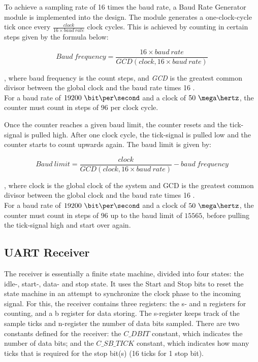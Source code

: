 \documentclass[main.tex]{subfiles}
\begin{document}
To achieve a sampling rate of 16 times the baud rate, a Baud Rate Generator module is implemented into the design. The module generates a one-clock-cycle tick once every $\frac{clock}{16 \times baud\ rate}$ clock cycles. This is achieved by counting in certain steps given by the formula below:

\begin{equation}
Baud\ frequency = \frac{16 \times baud\ rate}{GCD(clock, 16 \times baud\ rate)}
\end{equation}

, where baud frequency is the count steps, and \textit{GCD} is the greatest common divisor between the global clock and the baud rate times 16 \cite{velure10}. \\
For a baud rate of $19200\ \bit\per\second$ and a clock of $50\ \mega\hertz$, the counter must count in steps of $96$ per clock cycle. 

Once the counter reaches a given baud limit, the counter resets and the tick-signal is pulled high. After one clock cycle, the tick-signal is pulled low and the counter starts to count upwards again. The baud limit is given by:

\begin{equation}
Baud\ limit= \frac{clock}{GCD(clock, 16 \times baud\ rate)} - baud\ frequency
\end{equation}

, where clock is the global clock of the system and GCD is the greatest common divisor between the global clock and the baud rate times 16 \cite{velure10}. \\
For a baud rate of $19200\ \bit\per\second$ and a clock of $50\ \mega\hertz$, the counter must count in steps of $96$ up to the baud limit of $15565$, before pulling the tick-signal high and start over again. 

\subsection{UART Receiver}
The receiver is essentially a finite state machine, divided into four states: the idle-, start-, data- and stop state. It uses the Start and Stop bits to reset the state machine in an attempt to synchronize the clock phase to the incoming signal. For this, the receiver contains three registers: the s- and  n registers for counting, and a b register for data storing. The s-register keeps track of the sample ticks and n-register the number of data bits sampled.
There are two constants defined for the receiver: the $C\_DBIT$ constant, which indicates the number of data bits; and the $C\_SB\_TICK$ constant, which indicates how many ticks that is required for the stop bit(s) (16 ticks for 1 stop bit). 
\end{document}
